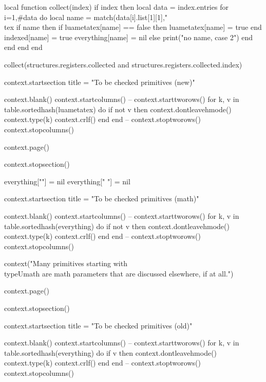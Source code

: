         local function collect(index)
            if index then
                local data = index.entries
                for i=1,#data do
                    local name = match(data[i].list[1][1],"\\tex%
                    if name then
                        if luametatex[name] == false then
                            luametatex[name] = true
                        end
                        indexed[name] = true
                        everything[name] = nil
                    else
                        print("no name, case 2")
                    end
                end
            end
        end

        collect(structures.registers.collected and structures.registers.collected.index)

        context.startsection { title = "To be checked primitives (new)" }

        context.blank()
        context.startcolumns()
     -- context.starttworows()
        for k, v in table.sortedhash(luametatex) do
            if not v then
                context.dontleavehmode()
                context.type(k)
                context.crlf()
            end
        end
     -- context.stoptworows()
        context.stopcolumns()

        context.page()

        context.stopsection()

        everything[""]  = nil
        everything[" "] = nil

        context.startsection { title = "To be checked primitives (math)" }

        context.blank()
        context.startcolumns()
     -- context.starttworows()
        for k, v in table.sortedhash(everything) do
            if not v then
                context.dontleavehmode()
                context.type(k)
                context.crlf()
            end
        end
     -- context.stoptworows()
        context.stopcolumns()

        context("Many primitives starting with \\type{Umath} are math parameters that are discussed elsewhere, if at all.")

        context.page()

        context.stopsection()

        context.startsection { title = "To be checked primitives (old)" }

        context.blank()
        context.startcolumns()
     -- context.starttworows()
        for k, v in table.sortedhash(everything) do
            if v then
                context.dontleavehmode()
                context.type(k)
                context.crlf()
            end
        end
     -- context.stoptworows()
        context.stopcolumns()

